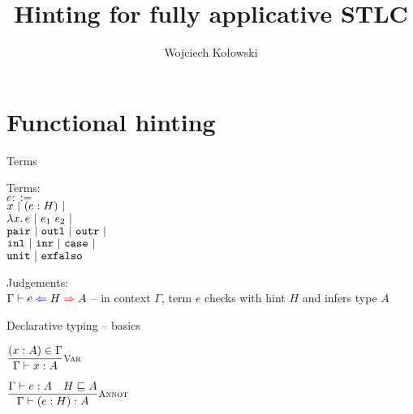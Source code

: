 \documentclass{beamer}
\title{Hinting for fully applicative STLC}
\author{Wojciech Kołowski}
\date{}
\begin{document}
\newcommand{\funpair}{\texttt{pair}}
\newcommand{\funoutl}{\texttt{outl}}
\newcommand{\funoutr}{\texttt{outr}}
\newcommand{\funinl}{\texttt{inl}}
\newcommand{\funinr}{\texttt{inr}}
\newcommand{\funcase}{\texttt{case}}
\newcommand{\funexfalso}{\texttt{exfalso}}

\frame{\titlepage}

\section{Functional hinting}

\begin{frame}{Terms}

Terms: \\
$e ::=$ \\
\qquad $x \pipe \annot{e}{H} \pipe $ \\
\qquad $\fun{x}{e} \pipe \app{e_1}{e_2} \pipe$ \\
\qquad $\funpair \pipe \funoutl \pipe \funoutr \pipe$ \\
\qquad $\funinl \pipe \funinr \pipe \funcase \pipe$ \\
\qquad $\unit \pipe \funexfalso$

\vspace{2em}

Judgements: \\
$\fullhinting{\Gamma}{e}{H}{A}$ -- in context $\Gamma$, term $e$ checks with hint $H$ and infers type $A$

\end{frame}

\begin{frame}{Declarative typing -- basics}

\begin{center}
  $\infrule[Var]{\sidecond{(x : A) \in \Gamma}}{\typing{x}{A}}$

  \vspace{2em}

  $\infrule[Annot]{\typing{e}{A} \quad \sidecond{\hintorder{H}{A}}}{\typing{\annot{e}{H}}{A}}$
\end{center}

\end{frame}
\end{document}
